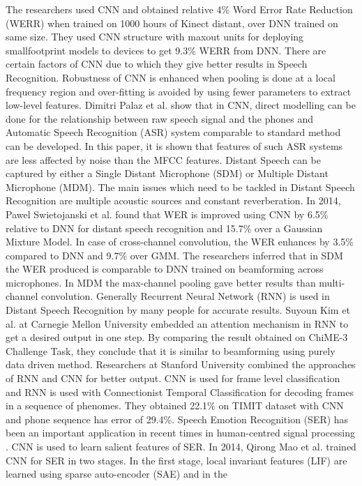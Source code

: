 \documentclass[12pt]{article}
\begin{document}
{{The researchers used CNN and obtained relative 4\% Word
Error Rate Reduction (WERR) when trained on 1000 hours
of Kinect distant, over DNN trained on same size. They
used CNN structure with maxout units for deploying smallfootprint models to devices to get 9.3\% WERR from DNN.
There are certain factors of CNN due to which they give
better results in Speech Recognition. Robustness of CNN is
enhanced when pooling is done at a local frequency region
and over-fitting is avoided by using fewer parameters to
extract low-level features. Dimitri Palaz et al. show
that in CNN, direct modelling can be done for the
relationship between raw speech signal and the phones and
Automatic Speech Recognition (ASR) system comparable
to standard method can be developed. In this paper, it is
shown that features of such ASR systems are less affected
by noise than the MFCC features.
Distant Speech can be captured by either a Single
Distant Microphone (SDM) or Multiple Distant
Microphone (MDM). The main issues which need to be
tackled in Distant Speech Recognition are multiple acoustic
sources and constant reverberation. In 2014, Pawel
Swietojanski et al.  found that WER is improved using
CNN by 6.5\% relative to DNN for distant speech
recognition and 15.7\% over a Gaussian Mixture Model. In
case of cross-channel convolution, the WER enhances by
3.5\% compared to DNN and 9.7\% over GMM. The
researchers inferred that in SDM the WER produced is
comparable to DNN trained on beamforming across microphones. In MDM the max-channel pooling gave better
results than multi-channel convolution. Generally Recurrent
Neural Network (RNN) is used in Distant Speech
Recognition by many people for accurate results. Suyoun
Kim et al. at Carnegie Mellon University embedded an
attention mechanism in RNN to get
a desired output in
one step. By comparing the result obtained on ChiME-3
Challenge Task, they conclude that it is similar to
beamforming using purely data driven method. Researchers
at Stanford University combined the approaches of RNN
and CNN for better output. CNN is used for frame level
classification and RNN is used with Connectionist
Temporal Classification for decoding frames in a sequence
of phenomes. They obtained 22.1\% on TIMIT dataset
with CNN and phone sequence has error of 29.4\%.
Speech Emotion Recognition (SER) has been an
important application in recent times in human-centred
signal processing . CNN is used to learn salient features
of SER. In 2014, Qirong Mao et al. trained CNN for SER in
two stages. In the first stage, local invariant features (LIF)
are learned using sparse auto-encoder (SAE) and in the
}}
\end{document}
